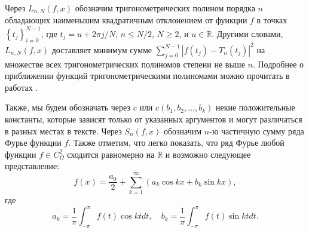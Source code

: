 Через $L_{n,N}(f,x)$ обозначим
тригонометрических полином порядка $n$ обладающих наименьшим квадратичным отклонением от функции $f$ в точках $\left\{t_{j}\right\} _{i=0}^{N-1}$,
где $t_{j}=u+2\pi j / N$, $n \leq N/2$, $N \geq 2$, и $u \in \mathbb{R}$. 
Другими словами, $L_{n,N}(f,x)$ доставляет минимум сумме 
$
\sum_{j=0}^{N-1}\left|f(t_{j})-T_{n}(t_{j})\right|^{2}
$
на множестве всех тригонометрических полиномов степени не выше $n$. 
Подробнее о приближении функций тригонометрическими полиномами можно прочитать в работах 
\cite{2_bernstein,4_erdos,7_kalashnikov,8_krilov,9_marcinkiewicz,10_marcinkiewicz,11_natanson,12_nikolsky,18_zigmund,17_turetsky}.

Также, мы будем обозначать через $c$ или $c(b_1, b_2, \ldots, b_k)$ некие положительные константы, которые зависят только от указанных аргументов и могут 
различаться в разных местах в тексте.  Через $S_n(f,x)$ обозначим $n$-ю частичную сумму ряда Фурье функции $f$. 
Также отметим, что легко показать, что ряд Фурье любой функции $f \in C_\Omega^{2}$ 
сходится равномерно на $\mathbb{R}$ и возможно следующее представление:
\begin{equation}\label{f_as_Fourier}
f(x) = \frac{a_0}{2} + \sum_{k=1}^{\infty} \left(a_k \cos kx + b_k \sin kx\right),
\end{equation} 
где
\begin{equation}\label{akbk_definition}
a_k = \frac1\pi \int_{-\pi}^{\pi} f(t) \cos kt dt,\quad b_k = \frac1\pi \int_{-\pi}^{\pi} f(t) \sin kt dt.
\end{equation}

